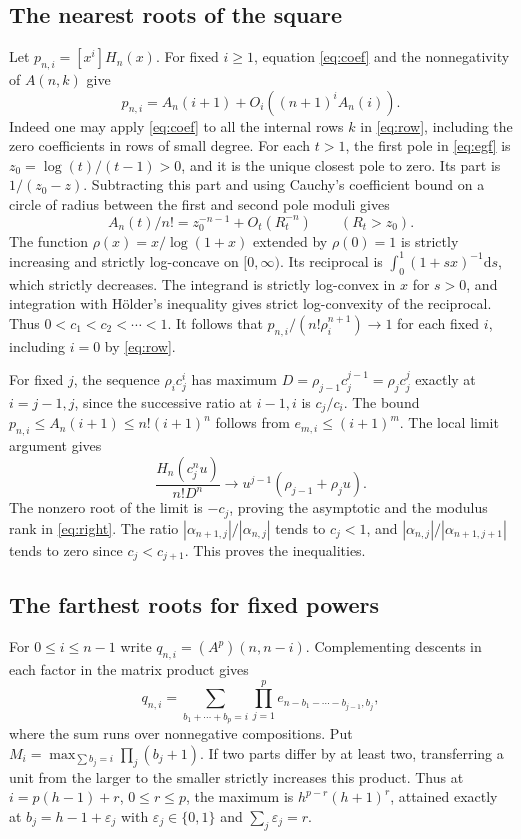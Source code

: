 \documentclass[11pt]{article}
\newcommand{\dd}{\mathrm d}
\begin{document}
\subsection{The nearest roots of the square}

Let \(p_{n,i}=[x^i]H_n(x)\). For fixed \(i\ge1\), equation \eqref{eq:coef} and the nonnegativity of \(A(n,k)\) give
\[
 p_{n,i}=A_n(i+1)+O_i((n+1)^i A_n(i)).
\]
Indeed one may apply \eqref{eq:coef} to all the internal rows \(k\) in \eqref{eq:row}, including the zero coefficients in rows of small degree. For each \(t>1\), the first pole in \eqref{eq:egf} is \(z_0=\log(t)/(t-1)>0\), and it is the unique closest pole to zero. Its part is \(1/(z_0-z)\). Subtracting this part and using Cauchy's coefficient bound on a circle of radius between the first and second pole moduli gives
\[
 A_n(t)/n!=z_0^{-n-1}+O_t(R_t^{-n})\qquad(R_t>z_0).
\]
The function \(\rho(x)=x/\log(1+x)\) extended by \(\rho(0)=1\) is strictly increasing and strictly log-concave on \([0,\infty)\). Its reciprocal is \(\int_0^1(1+sx)^{-1}\dd s\), which strictly decreases. The integrand is strictly log-convex in \(x\) for \(s>0\), and integration with H\"older's inequality gives strict log-convexity of the reciprocal. Thus \(0<c_1<c_2<\cdots<1\). It follows that \(p_{n,i}/(n!\rho_i^{n+1})\to1\) for each fixed \(i\), including \(i=0\) by \eqref{eq:row}.

For fixed \(j\), the sequence \(\rho_i c_j^i\) has maximum \(D=\rho_{j-1}c_j^{j-1}=\rho_j c_j^j\) exactly at \(i=j-1,j\), since the successive ratio at \(i-1,i\) is \(c_j/c_i\). The bound \(p_{n,i}\le A_n(i+1)\le n!(i+1)^n\) follows from \(e_{m,i}\le (i+1)^m\). The local limit argument gives
\[
 \frac{H_n(c_j^n u)}{n!D^n}\longrightarrow u^{j-1}(\rho_{j-1}+\rho_j u).
\]
The nonzero root of the limit is \(-c_j\), proving the asymptotic and the modulus rank in \eqref{eq:right}. The ratio \(|\alpha_{n+1,j}|/|\alpha_{n,j}|\) tends to \(c_j<1\), and \(|\alpha_{n,j}|/|\alpha_{n+1,j+1}|\) tends to zero since \(c_j<c_{j+1}\). This proves the inequalities.

\subsection{The farthest roots for fixed powers}

For \(0\le i\le n-1\) write \(q_{n,i}=(A^p)(n,n-i)\). Complementing descents in each factor in the matrix product gives
\begin{equation}\label{eq:paths}
 q_{n,i}=\sum_{b_1+\cdots+b_p=i}\prod_{j=1}^p
    e_{n-b_1-\cdots-b_{j-1},b_j},
\end{equation}
where the sum runs over nonnegative compositions. Put \(M_i=\max_{\sum b_j=i}\prod_j(b_j+1)\). If two parts differ by at least two, transferring a unit from the larger to the smaller strictly increases this product. Thus at \(i=p(h-1)+r\), \(0\le r\le p\), the maximum is \(h^{p-r}(h+1)^r\), attained exactly at \(b_j=h-1+\varepsilon_j\) with \(\varepsilon_j\in\{0,1\}\) and \(\sum_j\varepsilon_j=r\).
\end{document}
